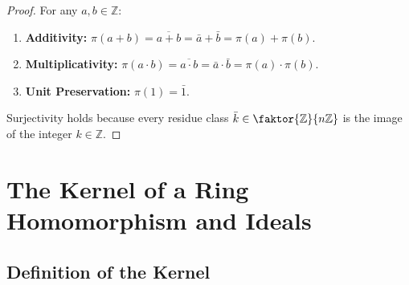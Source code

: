 \begin{content}

\begin{proof}
For any $a, b \in \mathbb{Z}$:
\begin{enumerate}[label=\textbf{(\roman*)}]
    \item \textbf{Additivity:} $\pi(a + b) = \overline{a + b} = \bar{a} + \bar{b} = \pi(a) + \pi(b)$.
    \item \textbf{Multiplicativity:} $\pi(a \cdot b) = \overline{a \cdot b} = \bar{a} \cdot \bar{b} = \pi(a) \cdot \pi(b)$.
    \item \textbf{Unit Preservation:} $\pi(1) = \bar{1}$.
\end{enumerate}
Surjectivity holds because every residue class $\bar{k} \in \faktor{\mathbb{Z}}{n\mathbb{Z}}$ is the image of the integer $k \in \mathbb{Z}$.
\end{proof}
\end{content}

\section{The Kernel of a Ring Homomorphism and Ideals}
\subsection{Definition of the Kernel}


